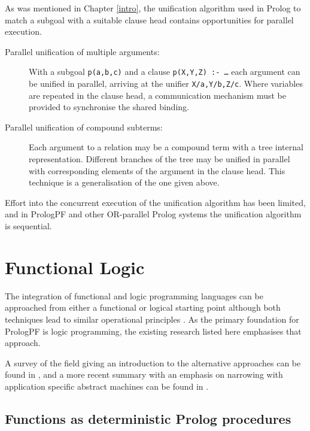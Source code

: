 As was mentioned in Chapter \ref{intro}, the unification algorithm used in Prolog 
to match a subgoal with a suitable clause head contains opportunities for
parallel execution.
\enlargethispage{2\baselineskip} %
\begin{description}
\item[Parallel unification of multiple arguments:]{ With a subgoal \texttt{p(a,b,c)} and
  a clause \texttt{p(X,Y,Z) :- \ldots} each argument can be unified in parallel, arriving at
  the unifier \texttt{X/a,Y/b,Z/c}.  Where variables are repeated in the clause head,
  a communication mechanism must be provided to synchronise the shared binding.}
\item[Parallel unification of compound subterms:]{ Each argument to a relation may be 
  a compound term with a tree internal representation.  Different branches of the
  tree may be unified in parallel with corresponding elements of the argument in the
  clause head.  This technique is a generalisation of the one given above.}
\end{description}

Effort into the concurrent execution of the unification algorithm has been limited, and
in PrologPF and other OR-parallel Prolog systems the unification algorithm is 
sequential.

\section{Functional Logic} %

The integration of functional and logic programming languages can be approached from either
a functional or logical starting point although both techniques lead to similar
operational principles \cite{Han94}.  As the primary foundation for PrologPF is
logic programming, the existing research listed here emphasises that approach.

A survey of the field giving an introduction to the alternative approaches can be found
in \cite{BL86}, and a more recent summary with an emphasis on narrowing \cite{Red85} with
application specific abstract machines can be found in \cite{Han94}.

\subsection{Functions as deterministic Prolog procedures}
\label{det_procs}

